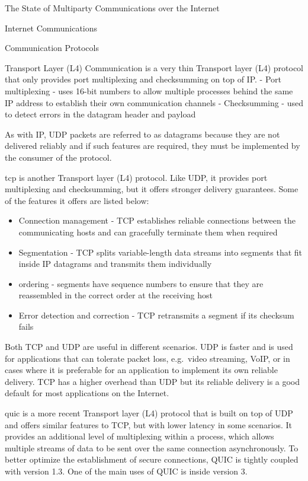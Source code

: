 \begin{frame}[fragile]{The State of Multiparty Communications over the
Internet}
\begin{block}{Internet Communications}
\begin{block}{Communication Protocols}
\begin{block}{Transport Layer (L4) Communication}
\protect\hypertarget{transport-layer-l4-communication}{}
 is a very thin Transport layer (L4) protocol that only provides
port multiplexing and checksumming on top of IP. - Port multiplexing -
uses 16-bit numbers to allow multiple processes behind the same IP
address to establish their own communication channels - Checksumming -
used to detect errors in the datagram header and payload

As with IP, UDP packets are referred to as datagrams because they are
not delivered reliably and if such features are required, they must be
implemented by the consumer of the protocol.

\gls{tcp} is another Transport layer (L4) protocol. Like UDP, it
provides port multiplexing and checksumming, but it offers stronger
delivery guarantees. Some of the features it offers are listed below:

\begin{itemize}
\tightlist
\item
  Connection management - TCP establishes reliable connections between
  the communicating hosts and can gracefully terminate them when
  required
\item
  Segmentation - TCP splits variable-length data streams into segments
  that fit inside IP datagrams and transmits them individually
\item
  ordering - segments have sequence numbers to ensure that they are
  reassembled in the correct order at the receiving host
\item
  Error detection and correction - TCP retransmits a segment if its
  checksum fails
\end{itemize}

Both TCP and UDP are useful in different scenarios. UDP is faster and is
used for applications that can tolerate packet loss, e.g.~video
streaming, VoIP, or in cases where it is preferable for an application
to implement its own reliable delivery. TCP has a higher overhead than
UDP but its reliable delivery is a good default for most applications on
the Internet.

\gls{quic} is a more recent Transport layer (L4) protocol that is built
on top of UDP and offers similar features to TCP, but with lower latency
in some scenarios. It provides an additional level of multiplexing
within a process, which allows multiple streams of data to be sent over
the same connection asynchronously. To better optimize the establishment
of secure connections, QUIC is tightly coupled with  version
1.3. One of the main uses of QUIC is inside  version 3.
\end{block}


\end{block}
\end{block}
\end{frame}

